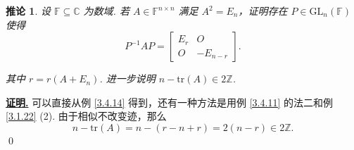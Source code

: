 \documentclass[10pt,openany]{article}
\theoremstyle{thmstyle} %
\theoremstyle{defstyle} %
\newtheorem{corollary}[theorem]{推论}
\theoremstyle{prostyle} %
\theoremstyle{exastyle}
\theoremstyle{remstyle}
\renewenvironment{proof}[1][证明]{\par\underline{\textbf{#1.}} \;\fangsong}{\qed\par}
\newcommand{\F}{\mathbb{F}}
\newcommand{\gfn}{\text{GL}_n(\mathbb{F})}
\newcommand{\C}{\mathbb{C}}
\newcommand{\n}{^{n \times n}}
\newcommand{\tr}{\mathrm{tr}}
\begin{document}
\begin{corollary}
	设 \( \F \subseteq \C \) 为数域. 若  \( A \in \F\n \) 满足 \( A^2=E_n \)，证明存在 \( P \in \gfn \) 使得
	\[ P^{-1}AP=\begin{bmatrix}
		E_r & O \\
		O & -E_{n-r}
	\end{bmatrix}. \]
	
	其中 \( r=r(A+E_n) \). 进一步说明 \( n-\tr(A) \in 2\mathbb{Z} \).
\end{corollary}

\begin{proof}
	可以直接从例 \ref{3.4.14} 得到，还有一种方法是用例 \ref{3.4.11} 的法二和例 \ref{3.1.22} (2). 由于相似不改变迹，那么
	\[ n-\tr(A)=n- (r-n+r)=2(n-r) \in 2\mathbb{Z}. \]
\end{proof}
\end{document}
